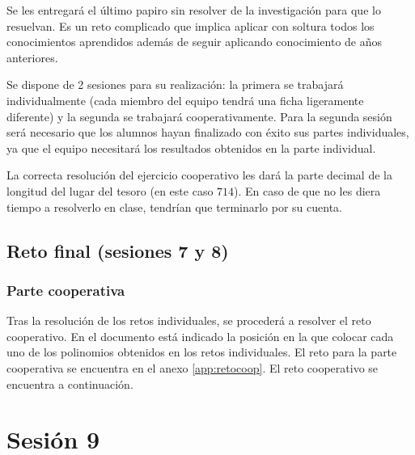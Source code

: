 Se les entregará el último papiro sin resolver de la investigación para que lo resuelvan.
%
Es un reto complicado que implica aplicar con soltura todos los conocimientos aprendidos además de seguir aplicando conocimiento de años anteriores.


Se dispone de 2 sesiones para su realización: la primera se trabajará individualmente (cada miembro del equipo tendrá una ficha ligeramente diferente) y la segunda se trabajará cooperativamente.
%
Para la segunda sesión será necesario que los alumnos hayan finalizado con éxito sus partes individuales, ya que el equipo necesitará los resultados obtenidos en la parte individual.

La correcta resolución del ejercicio cooperativo les dará la parte decimal de la longitud del lugar del tesoro (en este caso $714$).
%
En caso de que no les diera tiempo a resolverlo en clase, tendrían que terminarlo por su cuenta.


\subsection{Reto final (sesiones 7 y 8)}
\label{ses7:indiv}




\subsubsection{Parte cooperativa}
\label{ses7:coop}

Tras la resolución de los retos individuales, se procederá a resolver el reto cooperativo.
%
En el documento está indicado la posición en la que colocar cada uno de los polinomios obtenidos en los retos individuales.
%
\ifinapp
	El reto para la parte cooperativa se encuentra en el anexo \ref{app:retocoop}.
\else 
	El reto cooperativo se encuentra a continuación.
	
\fi







\section{Sesión 9}


